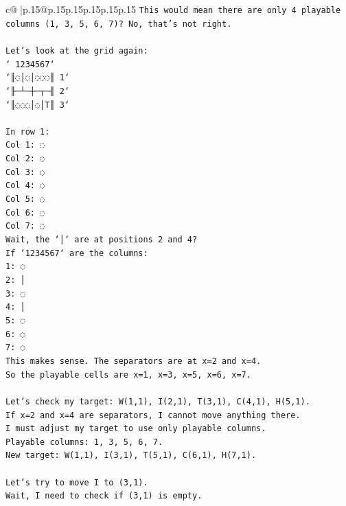 \documentclass{article}
\begin{document}
{\begin{supertabular}{c@{$\;$}|p{.15\linewidth}@{}p{.15\linewidth}p{.15\linewidth}p{.15\linewidth}p{.15\linewidth}p{.15\linewidth}}
{{{\texttt{This would mean there are only 4 playable columns (1, 3, 5, 6, 7)? No, that's not right.} \\
\\ 
\texttt{Let's look at the grid again:} \\
\texttt{` 1234567`} \\
\texttt{`║◌│◌│◌◌◌║ 1`} \\
\texttt{`╟─┴─┼─┬─╢ 2`} \\
\texttt{`║◌◌◌│◌│T║ 3`} \\
\\ 
\texttt{In row 1:} \\
\texttt{Col 1: ◌} \\
\texttt{Col 2: ◌} \\
\texttt{Col 3: ◌} \\
\texttt{Col 4: ◌} \\
\texttt{Col 5: ◌} \\
\texttt{Col 6: ◌} \\
\texttt{Col 7: ◌} \\
\texttt{Wait, the `│` are at positions 2 and 4?} \\
\texttt{If `1234567` are the columns:} \\
\texttt{1: ◌} \\
\texttt{2: │} \\
\texttt{3: ◌} \\
\texttt{4: │} \\
\texttt{5: ◌} \\
\texttt{6: ◌} \\
\texttt{7: ◌} \\
\texttt{This makes sense. The separators are at x=2 and x=4.} \\
\texttt{So the playable cells are x=1, x=3, x=5, x=6, x=7.} \\
\\ 
\texttt{Let's check my target: W(1,1), I(2,1), T(3,1), C(4,1), H(5,1).} \\
\texttt{If x=2 and x=4 are separators, I cannot move anything there.} \\
\texttt{I must adjust my target to use only playable columns.} \\
\texttt{Playable columns: 1, 3, 5, 6, 7.} \\
\texttt{New target: W(1,1), I(3,1), T(5,1), C(6,1), H(7,1).} \\
\\ 
\texttt{Let's try to move I to (3,1).} \\
\texttt{Wait, I need to check if (3,1) is empty.} \\
}}}
\end{supertabular}}
\end{document}
